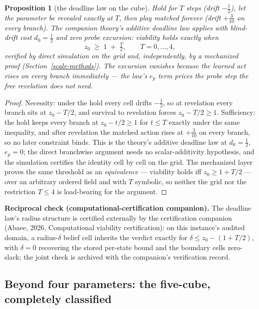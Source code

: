\documentclass[10pt,twocolumn]{article}
\theoremstyle{plain}
\newtheorem{proposition}[theorem]{Proposition}
\theoremstyle{definition}
\theoremstyle{remark}
\begin{document}
\begin{proposition}[the deadline law on the cube]\label{scale-prop:deadline}
Hold for \(T\) steps (drift \(-\tfrac12\)), let the parameter be
revealed exactly at \(T\), then play matched forever (drift
\(+\tfrac3{10}\) on every branch). The companion theory's additive
deadline law applies with blind-drift cost \(d_{0} = \tfrac12\) and
zero probe excursion: viability holds exactly when
\[
z_{0} \;\ge\; 1 \;+\; \tfrac{T}{2}, \qquad T = 0, \dots, 4,
\]
verified by direct simulation on the grid and, independently, by a
mechanized proof (Section~\ref{scale-methods}). The excursion vanishes
because the learned act rises on every branch immediately --- the
law's \(e_{p}\) term prices the probe step the free revelation does
not need.
\end{proposition}

\begin{proof}
Necessity: under the hold every cell drifts \(-\tfrac12\), so at
revelation every branch sits at \(z_{0} - T/2\), and survival to
revelation forces \(z_{0} - T/2 \ge 1\). Sufficiency: the hold keeps
every branch at \(z_{0} - t/2 \ge 1\) for \(t \le T\) exactly
under the same inequality, and after revelation the matched action
rises at \(+\tfrac3{10}\) on every branch, so no later constraint
binds. This is the theory's additive deadline law at
\(d_{0} = \tfrac12\), \(e_{p} = 0\); the direct branchwise argument
needs no scalar-additivity hypothesis, and the simulation certifies
the identity cell by cell on the grid. The mechanized layer proves
the same threshold as an \emph{equivalence} --- viability holds iff
\(z_{0} \ge 1 + T/2\) --- over an arbitrary ordered field and with
\(T\) symbolic, so neither the grid nor the restriction
\(T \le 4\) is load-bearing for the argument.
\end{proof}

\medskip
\noindent\textbf{Reciprocal check (computational-certification
companion).} The deadline law's radius structure is certified
externally by the certification companion (Abaee, 2026, Computational viability certification): on this
instance's audited domain, a radius-\(\delta\) belief cell inherits
the verdict exactly for \(\delta \le z_{0} - (1 + T/2)\), with
\(\delta = 0\) recovering the stored per-state bound and the
boundary cells zero-slack; the joint check is archived with the
companion's verification record.

\subsection{Beyond four parameters: the five-cube, completely classified}
\label{scale-fivecube}
\end{document}

